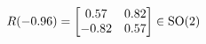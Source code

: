 \documentclass[preview]{standalone}
\begin{document}
\begin{align*}
\special{dvisvgm:raw <g id='unique000'>}R(-0.96) = \begin{bmatrix} 0.57 & 0.82 \\ -0.82 & 0.57 \end{bmatrix} \in \text{SO}(2)\special{dvisvgm:raw </g>}
\end{align*}
\end{document}
